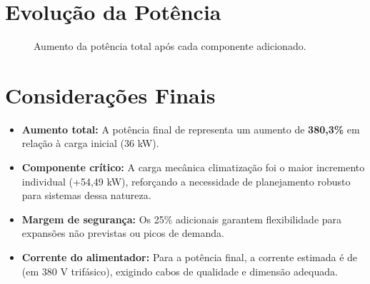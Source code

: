 \documentclass[12pt]{article}
\begin{document}
\section*{Evolução da Potência}
\begin{figure}[h!]
    \centering
    \caption{Aumento da potência total após cada componente adicionado.}
\end{figure}

\section*{Considerações Finais}
\begin{itemize}
    \item \textbf{Aumento total:} A potência final de  representa um aumento de \textbf{380,3\%} em relação à carga inicial (36 kW).
    \item \textbf{Componente crítico:} A carga mecânica climatização foi o maior incremento individual (+54,49 kW), reforçando a necessidade de planejamento robusto para sistemas dessa natureza.
    \item \textbf{Margem de segurança:} Os 25\% adicionais garantem flexibilidade para expansões não previstas ou picos de demanda.
    \item \textbf{Corrente do alimentador:} Para a potência final, a corrente estimada é de  (em 380 V trifásico), exigindo cabos de qualidade e dimensão adequada.
\end{itemize}
\end{document}
